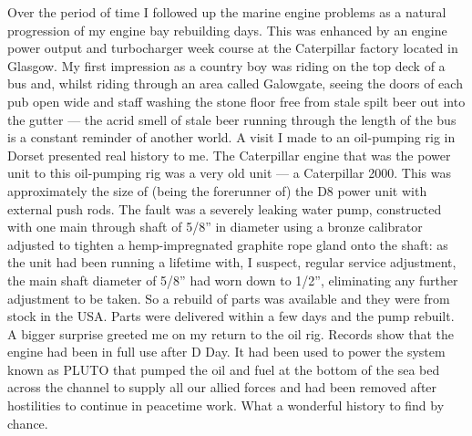 Over the period of time I followed up the marine engine problems as a natural
progression of my engine bay rebuilding days. This was enhanced by an engine
power output and turbocharger week course at the Caterpillar factory located in
Glasgow. My first impression as a country boy was riding on the top deck of a
bus and, whilst riding through an area called Galowgate, seeing the doors of
each pub open wide and staff washing the stone floor free from stale spilt beer
out into the gutter --- the acrid smell of stale beer running through the
length of the bus is a constant reminder of another world. A visit I made to an
oil-pumping rig in Dorset presented real history to me. The Caterpillar engine
that was the power unit to this oil-pumping rig was a very old unit --- a
Caterpillar 2000. This was approximately the size of (being the forerunner of)
the D8 power unit with external push rods. The fault was a severely leaking
water pump, constructed with one main through shaft of 5/8'' in diameter using
a bronze calibrator adjusted to tighten a hemp-impregnated graphite rope gland
onto the shaft: as the unit had been running a lifetime with, I suspect,
regular service adjustment, the main shaft diameter of 5/8'' had worn down to
1/2'', eliminating any further adjustment to be taken. So a rebuild of parts
was available and they were from stock in the USA. Parts were delivered within
a few days and the pump rebuilt. A bigger surprise greeted me on my return to
the oil rig. Records show that the engine had been in full use after D Day. It
had been used to power the system known as PLUTO that pumped the oil and fuel
at the bottom of the sea bed across the channel to supply all our allied forces
and had been removed after hostilities to continue in peacetime work. What a
wonderful history to find by chance.

